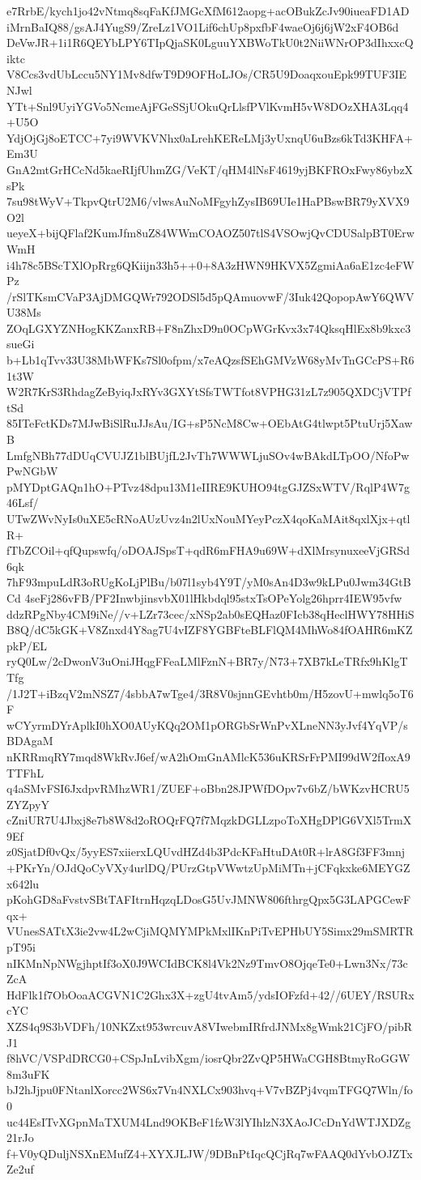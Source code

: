e7RrbE/kych1jo42vNtmq8sqFaKfJMGcXfM612aopg+acOBukZcJv90iueaFD1AD
iMrnBaIQ88/gsAJ4YugS9/ZreLz1VO1Lif6chUp8pxfbF4waeOj6j6jW2xF4OB6d
DeVwJR+1i1R6QEYbLPY6TIpQjaSK0LguuYXBWoTkU0t2NiiWNrOP3dIhxxcQiktc
V8Ccs3vdUbLccu5NY1Mv8dfwT9D9OFHoLJOs/CR5U9DoaqxouEpk99TUF3IENJwl
YTt+Snl9UyiYGVo5NcmeAjFGeSSjUOkuQrLlsfPVlKvmH5vW8DOzXHA3Lqq4+U5O
YdjOjGj8oETCC+7yi9WVKVNhx0aLrehKEReLMj3yUxnqU6uBzs6kTd3KHFA+Em3U
GnA2mtGrHCcNd5kaeRIjfUhmZG/VeKT/qHM4lNsF4619yjBKFROxFwy86ybzXsPk
7su98tWyV+TkpvQtrU2M6/vlwsAuNoMFgyhZysIB69UIe1HaPBswBR79yXVX9O2l
ueyeX+bijQFlaf2KumJfm8uZ84WWmCOAOZ507tlS4VSOwjQvCDUSalpBT0ErwWmH
i4h78c5BScTXlOpRrg6QKiijn33h5++0+8A3zHWN9HKVX5ZgmiAa6aE1zc4eFWPz
/rSlTKsmCVaP3AjDMGQWr792ODSl5d5pQAmuovwF/3Iuk42QopopAwY6QWVU38Ms
ZOqLGXYZNHogKKZanxRB+F8nZhxD9n0OCpWGrKvx3x74QksqHlEx8b9kxc3sueGi
b+Lb1qTvv33U38MbWFKs7Sl0ofpm/x7eAQzsfSEhGMVzW68yMvTnGCcPS+R61t3W
W2R7KrS3RhdagZeByiqJxRYv3GXYtSfsTWTfot8VPHG31zL7z905QXDCjVTPftSd
85ITeFctKDs7MJwBiSlRuJJsAu/IG+sP5NcM8Cw+OEbAtG4tlwpt5PtuUrj5XawB
LmfgNBh77dDUqCVUJZ1blBUjfL2JvTh7WWWLjuSOv4wBAkdLTpOO/NfoPwPwNGbW
pMYDptGAQn1hO+PTvz48dpu13M1eIIRE9KUHO94tgGJZSxWTV/RqlP4W7g46Lsf/
UTwZWvNyIs0uXE5cRNoAUzUvz4n2lUxNouMYeyPczX4qoKaMAit8qxlXjx+qtlR+
fTbZCOil+qfQupswfq/oDOAJSpsT+qdR6mFHA9u69W+dXlMrsynuxeeVjGRSd6qk
7hF93mpuLdR3oRUgKoLjPlBu/b07l1syb4Y9T/yM0sAn4D3w9kLPu0Jwm34GtBCd
4seFj286vFB/PF2InwbjinsvbX01lHkbdql95stxTsOPeYolg26hprr4IEW95vfw
ddzRPgNby4CM9iNe//v+LZr73cec/xNSp2ab0sEQHaz0FIcb38qHeclHWY78HHiS
B8Q/dC5kGK+V8Znxd4Y8ag7U4vIZF8YGBFteBLFlQM4MhWo84fOAHR6mKZpkP/EL
ryQ0Lw/2cDwonV3uOniJHqgFFeaLMlFznN+BR7y/N73+7XB7kLeTRfx9hKlgTTfg
/1J2T+iBzqV2mNSZ7/4sbbA7wTge4/3R8V0sjnnGEvhtb0m/H5zovU+mwlq5oT6F
wCYyrmDYrAplkI0hXO0AUyKQq2OM1pORGbSrWnPvXLneNN3yJvf4YqVP/sBDAgaM
nKRRmqRY7mqd8WkRvJ6ef/wA2hOmGnAMlcK536uKRSrFrPMI99dW2fIoxA9TTFhL
q4aSMvFSI6JxdpvRMhzWR1/ZUEF+oBbn28JPWfDOpv7v6bZ/bWKzvHCRU5ZYZpyY
cZniUR7U4Jbxj8e7b8W8d2oROQrFQ7f7MqzkDGLLzpoToXHgDPlG6VXl5TrmX9Ef
z0SjatDf0vQx/5yyES7xiierxLQUvdHZd4b3PdcKFaHtuDAt0R+lrA8Gf3FF3mnj
+PKrYn/OJdQoCyVXy4urlDQ/PUrzGtpVWwtzUpMiMTn+jCFqkxke6MEYGZx642lu
pKohGD8aFvstvSBtTAFItrnHqzqLDosG5UvJMNW806fthrgQpx5G3LAPGCewFqx+
VUnesSATtX3ie2vw4L2wCjiMQMYMPkMxlIKnPiTvEPHbUY5Simx29mSMRTRpT95i
nIKMnNpNWgjhptIf3oX0J9WCIdBCK8l4Vk2Nz9TmvO8OjqeTe0+Lwn3Nx/73cZcA
HdFlk1f7ObOoaACGVN1C2Ghx3X+zgU4tvAm5/ydsIOFzfd+42//6UEY/RSURxcYC
XZS4q9S3bVDFh/10NKZxt953wrcuvA8VIwebmIRfrdJNMx8gWmk21CjFO/pibRJ1
f8hVC/VSPdDRCG0+CSpJnLvibXgm/iosrQbr2ZvQP5HWaCGH8BtmyRoGGW8m3uFK
bJ2hJjpu0FNtanlXorcc2WS6x7Vn4NXLCx903hvq+V7vBZPj4vqmTFGQ7Wln/fo0
uc44EsITvXGpnMaTXUM4Lnd9OKBeF1fzW3lYIhlzN3XAoJCcDnYdWTJXDZg21rJo
f+V0yQDuljNSXnEMufZ4+XYXJLJW/9DBnPtIqcQCjRq7wFAAQ0dYvbOJZTxZe2uf
